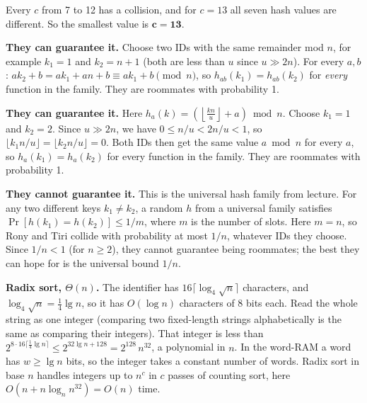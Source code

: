 \documentclass[12pt,twoside]{article}
\begin{document}
\begin{problems}
\begin{problemparts}
Every $c$ from 7 to 12 has a collision, and for $c=13$ all seven hash values are different.
So the smallest value is $\mathbf{c=13}$.
\end{problemparts}

\newpage

\problem  %

\begin{problemparts}
\problempart %
\textbf{They can guarantee it.} Choose two IDs with the same remainder mod $n$, for example
$k_1=1$ and $k_2=n+1$ (both are less than $u$ since $u\gg 2n$). For every $a,b$:
$ak_2+b = ak_1 + an + b \equiv ak_1+b \pmod n$, so $h_{ab}(k_1)=h_{ab}(k_2)$ for \emph{every}
function in the family. They are roommates with probability 1.

\problempart %
\textbf{They can guarantee it.} Here $h_a(k)=\left(\left\lfloor \frac{kn}{u}\right\rfloor + a\right)\bmod n$.
Choose $k_1=1$ and $k_2=2$. Since $u\gg 2n$, we have $0\le n/u < 2n/u < 1$, so
$\lfloor k_1 n/u\rfloor=\lfloor k_2 n/u\rfloor=0$. Both IDs then get the same value $a \bmod n$ for
every $a$, so $h_a(k_1)=h_a(k_2)$ for every function in the family. They are roommates with probability 1.

\problempart %
\textbf{They cannot guarantee it.} This is the universal hash family from lecture. For any two
different keys $k_1\ne k_2$, a random $h$ from a universal family satisfies
$\Pr[h(k_1)=h(k_2)]\le 1/m$, where $m$ is the number of slots. Here $m=n$, so Rony and Tiri
collide with probability at most $1/n$, whatever IDs they choose. Since $1/n<1$ (for $n\ge 2$), they
cannot guarantee being roommates; the best they can hope for is the universal bound $1/n$.
\end{problemparts}

\newpage

\problem  %

\begin{problemparts}
\problempart %
\textbf{Radix sort, $\Theta(n)$.} The identifier has $16\lceil\log_4\sqrt n\rceil$ characters, and
$\log_4\sqrt n=\tfrac14\lg n$, so it has $O(\log n)$ characters of 8 bits each. Read the whole string as one
integer (comparing two fixed-length strings alphabetically is the same as comparing their integers).
That integer is less than
$2^{8\cdot 16\lceil\frac14\lg n\rceil}\le 2^{32\lg n+128}=2^{128}\,n^{32}$, a polynomial in $n$.
In the word-RAM a word has $w\ge\lg n$ bits, so the integer takes a constant number of words.
Radix sort in base $n$ handles integers up to $n^{c}$ in $c$ passes of counting sort, here
$O(n+n\log_n n^{32})=O(n)$ time.


\end{problemparts}
\end{problems}
\end{document}
